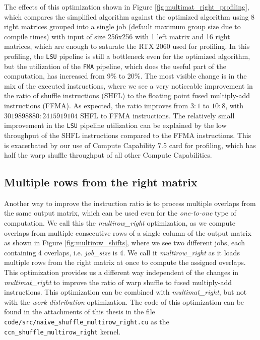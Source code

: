 The effects of this optimization shown in Figure \ref{fig:multimat_right_profiling}, which compares the simplified algorithm against the optimized algorithm using 8 right matrices grouped into a single job (default maximum group size due to compile times) with input of size 256x256 with 1 left matrix and 16 right matrices, which are enough to saturate the RTX 2060 used for profiling. In this profiling, the \texttt{LSU} pipeline is still a bottleneck even for the optimized algorithm, but the utilization of the \texttt{FMA} pipeline, which does the useful part of the computation, has increased from 9\% to 20\%. The most visible change is in the mix of the executed instructions, where we see a very noticeable improvement in the ratio of shuffle instructions (SHFL) to the floating point fused multiply-add instructions (FFMA). As expected, the ratio improves from $3 : 1$ to $10 : 8$, with $3 019 898 880 : 2 415 919 104$ SHFL to FFMA instructions. The relatively small improvement in the \texttt{LSU} pipeline utilization can be explained by the low throughput of the SHFL instructions compared to the FFMA instructions. This is exacerbated by our use of Compute Capability 7.5 card for profiling, which has half the warp shuffle throughput of all other Compute Capabilities.

\subsection{Multiple rows from the right matrix}
\label{sec:multirow_right}

Another way to improve the instruction ratio is to process multiple overlaps from the same output matrix, which can be used even for the \textit{one-to-one} type of computation. We call this the \textit{multirow\_right} optimization, as we compute overlaps from multiple consecutive rows of a single column of the output matrix as shown in Figure \ref{fig:multirow_shifts}, where we see two different jobs, each containing 4 overlaps, i.e. \textit{job\_size} is 4. We call it \textit{multirow\_right} as it loads multiple rows from the right matrix at once to compute the assigned overlaps. This optimization provides us a different way independent of the changes in \textit{multimat\_right} to improve the ratio of warp shuffle to fused multiply-add instructions. This optimization can be combined with \textit{multimat\_right}, but not with the \textit{work distribution} optimization. The code of this optimization can be found in the attachments of this thesis in the file \texttt{code/src/naive\_shuffle\_multirow\_right.cu} as the \texttt{ccn\_shuffle\_multirow\_right} kernel. 


